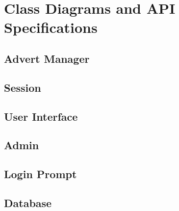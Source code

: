 \documentclass[12pt]{article}
\begin{document}
\section{Class Diagrams and API Specifications}

\subsection{Advert Manager}

\subsection{Session}

\subsection{User Interface}

\subsection{Admin}

\subsection{Login Prompt}

\subsection{Database}
\end{document}
